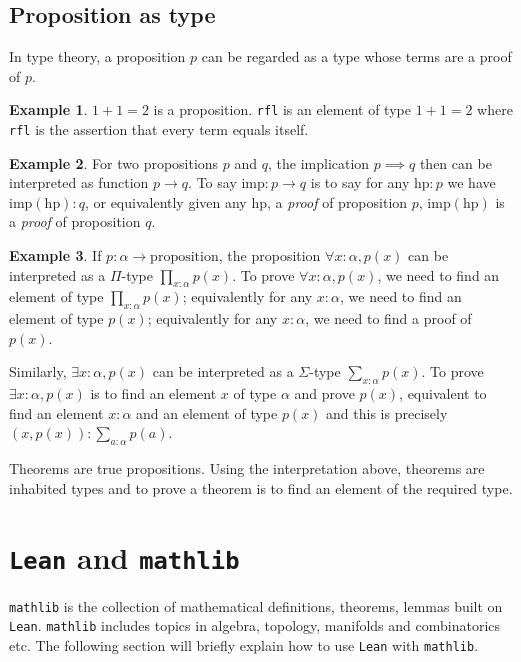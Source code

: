 \documentclass{report}
\theoremstyle{definition}
\newtheorem{example}{Example}
\begin{document}
\subsection{Proposition as type}
In type theory, a proposition $p$ can be regarded as a type whose terms are a proof of $p$.

\begin{example}
$1+1=2$ is a proposition. {\tt \small rfl} is an element of type $1+1=2$ where {\tt \small rfl} is the assertion that every term equals itself.
\end{example}

\begin{example}
For two propositions $p$ and $q$, the implication $p\implies q$ then can be interpreted as function $p\to q$. To say $\mathrm{imp}: p\to q$ is to say for any $\mathrm{hp}:p$ we have $\mathrm{imp}( \mathrm{hp}): q$, or equivalently given any $\mathrm{hp}$, a {\it proof} of proposition $p$, $\mathrm{imp}(\mathrm{hp})$ is a {\it proof} of proposition $q$. 
\end{example}

\begin{example}
If $p:\alpha\to\mathrm{proposition}$, the proposition
$\forall x : \alpha, p(x)$ can be interpreted as a $\Pi$-type $\prod_{x:\alpha} p(x)$. To prove $\forall x: \alpha, p(x)$, we need to find an element of type $\prod_{x:\alpha} p(x)$; equivalently for any $x:\alpha$, we need to find an element of type $p(x)$; equivalently for any $x:\alpha$, we need to find a proof of $p (x)$.

Similarly, $\exists x:\alpha, p(x)$ can be interpreted as a $\Sigma$-type $\sum_{x:\alpha} p(x)$. To prove $\exists x:\alpha, p(x)$ is to find an element $x$ of type $\alpha$ and prove $p(x)$, equivalent to find an element $x:\alpha$ and an element of type $p(x)$ and this is precisely $(x, p(x)):\sum_{a:\alpha} p(a)$.
\end{example}

Theorems are true propositions. Using the interpretation above, theorems are inhabited types and to prove a theorem is to find an element of the required type.

\section{{\tt Lean} and {\tt mathlib}}
{\tt \small mathlib} is the collection of mathematical definitions, theorems, lemmas built on {\tt \small Lean}. {\tt \small mathlib} includes topics in algebra, topology, manifolds and combinatorics etc. The following section will briefly explain how to use {\tt \small Lean} with {\tt \small mathlib}.
\end{document}
